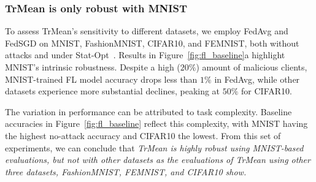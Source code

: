 \subsubsection{TrMean is only robust with MNIST}\label{impact:datasets:trmean}
To assess TrMean's sensitivity to different datasets, we employ FedAvg and FedSGD on MNIST, FashionMNIST, CIFAR10, and FEMNIST, both without attacks and under Stat-Opt~\cite{fang2020local}. Results in Figure~\ref{fig:fl_baseline}a highlight MNIST's intrinsic robustness. Despite a high ($20\%$) amount of malicious clients, MNIST-trained FL model accuracy drops less than $1\%$ in FedAvg, while other datasets experience more substantial declines, peaking at $50\%$ for CIFAR10.

The variation in performance can be attributed to task complexity. 
Baseline accuracies in Figure~\ref{fig:fl_baseline} reflect this complexity, with MNIST having the highest no-attack accuracy and CIFAR10 the lowest.
From this set of experiments, we can conclude that \emph{TrMean is highly robust using MNIST-based evaluations, but not with other datasets as the evaluations of TrMean using other three datasets, FashionMNIST, FEMNIST, and CIFAR10 show.}
